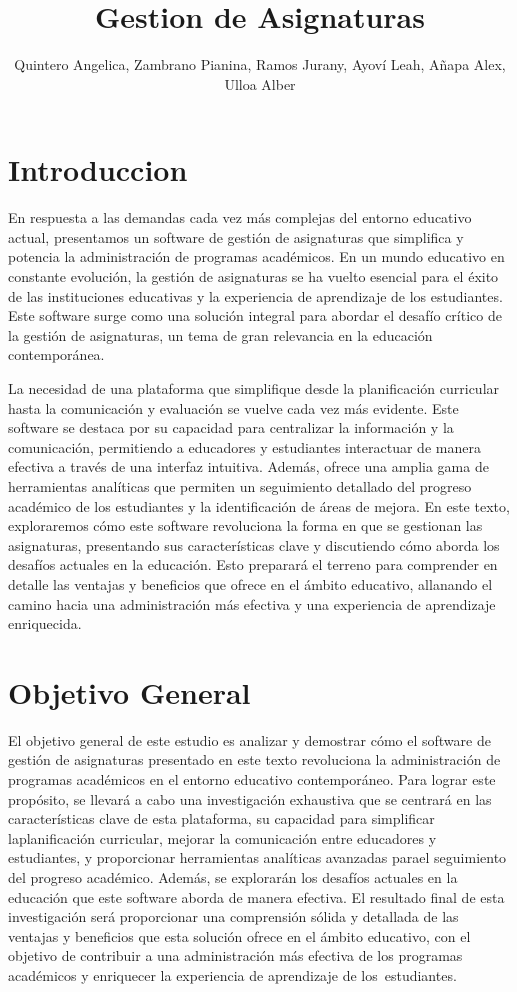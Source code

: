 \documentclass[11pt]{article}
\title{ Gestion de Asignaturas}
\author{Quintero Angelica, Zambrano Pianina, Ramos Jurany, Ayoví Leah, Añapa Alex, Ulloa Alber}
\date{\todday}
\begin{document}
\maketitle
\section{Introduccion}

En respuesta a las demandas cada vez más complejas del entorno educativo actual, presentamos un software de gestión de
asignaturas que simplifica y potencia la administración de programas académicos. En un mundo educativo en constante
evolución, la gestión de asignaturas se ha vuelto esencial para el éxito de las instituciones educativas y la experiencia
de aprendizaje de los estudiantes. Este software surge como una solución integral para abordar el desafío crítico de la 
gestión de asignaturas, un tema de gran relevancia en la educación contemporánea.


La necesidad de una plataforma que simplifique desde la planificación curricular hasta la comunicación y
evaluación se vuelve cada vez más evidente. Este software se destaca por su capacidad para centralizar la información
y la comunicación, permitiendo a educadores y estudiantes interactuar de manera efectiva a través de una interfaz
intuitiva. Además, ofrece una amplia gama de herramientas analíticas que permiten un seguimiento detallado del progreso
académico de los estudiantes y la identificación de áreas de mejora. En este texto, exploraremos cómo este
software revoluciona la forma en que se gestionan las asignaturas, presentando sus características clave y discutiendo
cómo aborda los desafíos actuales en la educación. Esto preparará el terreno para comprender en detalle las ventajas y
beneficios que ofrece en el ámbito educativo, allanando el camino hacia una administración más efectiva y una
experiencia de aprendizaje enriquecida.

\section{Objetivo General}
El objetivo general de este estudio es analizar y demostrar cómo el software de gestión de asignaturas presentado en este texto
revoluciona la administración de programas académicos en el entorno educativo contemporáneo. Para lograr este propósito, se llevará a
cabo una investigación exhaustiva que se centrará en las características clave de esta plataforma, su capacidad para simplificar laplanificación curricular, mejorar la comunicación entre educadores y estudiantes, y proporcionar herramientas analíticas avanzadas parael seguimiento del progreso académico. Además, se explorarán los desafíos actuales en la educación que este software aborda de manera efectiva. El resultado final de esta investigación será proporcionar una comprensión sólida y detallada de las ventajas y beneficios que esta solución ofrece en el ámbito educativo, con el objetivo de contribuir a una administración más efectiva de los programas académicos y enriquecer la experiencia de aprendizaje de los estudiantes.
\end{document}

